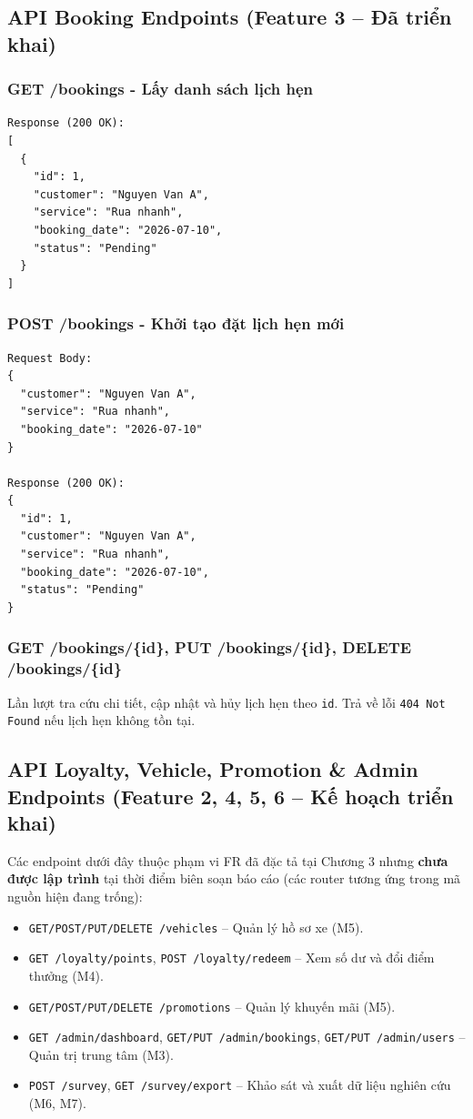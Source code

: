 \subsection{API Booking Endpoints (Feature 3 -- Đã triển khai)}

\subsubsection{GET /bookings - Lấy danh sách lịch hẹn}
\begin{verbatim}
Response (200 OK):
[
  {
    "id": 1,
    "customer": "Nguyen Van A",
    "service": "Rua nhanh",
    "booking_date": "2026-07-10",
    "status": "Pending"
  }
]
\end{verbatim}

\subsubsection{POST /bookings - Khởi tạo đặt lịch hẹn mới}
\begin{verbatim}
Request Body:
{
  "customer": "Nguyen Van A",
  "service": "Rua nhanh",
  "booking_date": "2026-07-10"
}

Response (200 OK):
{
  "id": 1,
  "customer": "Nguyen Van A",
  "service": "Rua nhanh",
  "booking_date": "2026-07-10",
  "status": "Pending"
}
\end{verbatim}

\subsubsection{GET /bookings/\{id\}, PUT /bookings/\{id\}, DELETE /bookings/\{id\}}
Lần lượt tra cứu chi tiết, cập nhật và hủy lịch hẹn theo \texttt{id}. Trả về lỗi \texttt{404 Not Found} nếu lịch hẹn không tồn tại.

\subsection{API Loyalty, Vehicle, Promotion \& Admin Endpoints (Feature 2, 4, 5, 6 -- Kế hoạch triển khai)}
Các endpoint dưới đây thuộc phạm vi FR đã đặc tả tại Chương 3 nhưng \textbf{chưa được lập trình} tại thời điểm biên soạn báo cáo (các router tương ứng trong mã nguồn hiện đang trống):

\begin{itemize}
    \item \texttt{GET/POST/PUT/DELETE /vehicles} -- Quản lý hồ sơ xe (M5).
    \item \texttt{GET /loyalty/points}, \texttt{POST /loyalty/redeem} -- Xem số dư và đổi điểm thưởng (M4).
    \item \texttt{GET/POST/PUT/DELETE /promotions} -- Quản lý khuyến mãi (M5).
    \item \texttt{GET /admin/dashboard}, \texttt{GET/PUT /admin/bookings}, \texttt{GET/PUT /admin/users} -- Quản trị trung tâm (M3).
    \item \texttt{POST /survey}, \texttt{GET /survey/export} -- Khảo sát và xuất dữ liệu nghiên cứu (M6, M7).
\end{itemize}